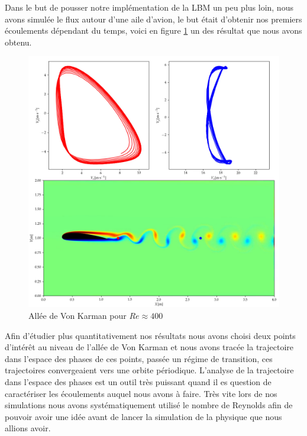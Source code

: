Dans le but de pousser notre implémentation de la LBM un peu plus loin, nous avons simulée le flux autour d'une aile d'avion, le but était d'obtenir nos premiers écoulements dépendant du temps, voici en figure \ref{fig:VK} un des résultat que nous avons obtenu.

\begin{figure}[hbtp]
  \centering
  \includegraphics[width=\linewidth]{Fig/VK.png}
  \caption{Allée de Von Karman pour $Re \approx 400$}
  \label{fig:VK}
\end{figure}

Afin d'étudier plus quantitativement nos résultats nous avons choisi deux points d'intérêt au niveau de l'allée de Von Karman et nous avons tracée la trajectoire dans l'espace des phases de ces points, passée un régime de transition, ces trajectoires convergeaient vers une orbite périodique. L'analyse de la trajectoire dans l'espace des phases est un outil
très puissant quand il es question de caractériser les écoulements auquel nous avons à faire.
Très vite lors de nos simulations nous avons systématiquement utilisé le nombre de Reynolds afin de pouvoir avoir une idée avant de lancer la simulation de la physique que nous allions avoir.

